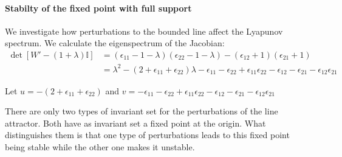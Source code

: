 \documentclass{article} %
\newcounter{ct}
\newcommand{\win}{\vW_{\text{in}}}
\newcommand{\wout}{\vW_{\text{out}}}
\newcommand{\bout}{\vb_{\text{out}}}
\theoremstyle{definition}
\theoremstyle{remark}
\begin{document}

%
%


\paragraph{Stabilty of the fixed point with full support}
We investigate how perturbations to the bounded line affect the Lyapunov spectrum.
We calculate the eigenspectrum of the Jacobian:
\begin{align*}
\det [W' -(1+\lambda)\mathbb{I}] &= (\epsilon_{11}-1-\lambda)(\epsilon_{22}-1-\lambda)-(\epsilon_{12}+1)(\epsilon_{21}+1)\\
&=\lambda^2 - (2+\epsilon_{11}+\epsilon_{22})\lambda -\epsilon_{11}-\epsilon_{22}+\epsilon_{11}\epsilon_{22} -\epsilon_{12} - \epsilon_{21} - \epsilon_{12}\epsilon_{21}
\end{align*}

Let 
$u=- (2+\epsilon_{11}+\epsilon_{22})$
and 
$v=-\epsilon_{11}-\epsilon_{22}+\epsilon_{11}\epsilon_{22} -\epsilon_{12} - \epsilon_{21} - \epsilon_{12}\epsilon_{21}$

There are only two types of invariant set for the perturbations of the line attractor. Both have as invariant set a fixed point at the origin. What distinguishes them is that one type of perturbations leads to this fixed point being stable while the other one makes it unstable.
\end{document}
